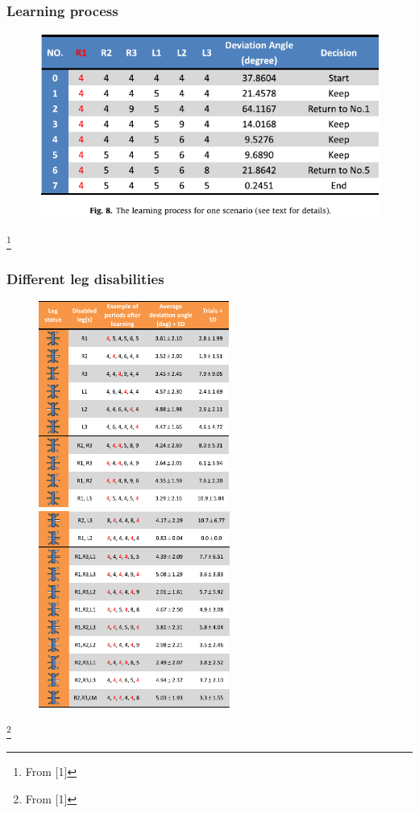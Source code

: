 \documentclass{beamer}
\begin{document}
\begin{frame}
\frametitle{Learning process}
\begin{figure}
\center
\includegraphics[width=1\textwidth]{figs/learning-process.pdf}
\end{figure}
\footnote{From [1]}
\end{frame}

\begin{frame}
\frametitle{Different leg disabilities}
\vspace*{-0.6cm}
\begin{figure}
\hspace*{-1cm}
\includegraphics[width=0.56\textwidth]{figs/disable-legs-list-1.pdf}
\includegraphics[width=0.56\textwidth]{figs/disable-legs-list-2.pdf}
\end{figure}
\footnote{From [1]}
\end{frame}
\end{document}
